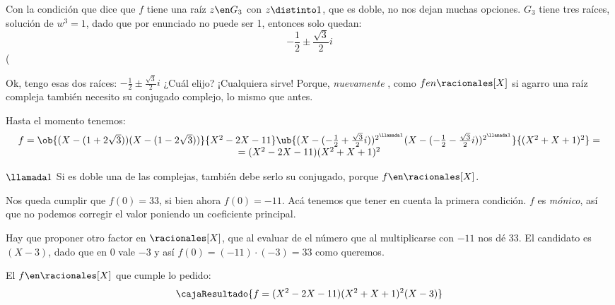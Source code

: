 \bigskip

Con la condición que dice que $f$ tiene una raíz $z \en G_3$ con $z \distinto 1$,
que es doble, no nos dejan muchas opciones. $G_3$ tiene tres raíces, solución
de $w^3 = 1$, dado que por enunciado no puede ser 1, entonces solo quedan:
$$
  -\frac{1}{2} \pm \frac{\sqrt{3}}{2}i
$$
(

\bigskip

Ok, tengo esas dos raíces: $-\frac{1}{2} \pm \frac{\sqrt{3}}{2}i$ ¿Cuál elijo? ¡Cualquiera
sirve! Porque, \textit{nuevamente {\tiny {}}}, como $f en \racionales[X]$ si agarro una raíz compleja
también necesito su conjugado complejo, lo mismo que antes.\par

Hasta el momento tenemos:
$$
  \begin{array}{c}
    f =
    \ob{(X - (1+2\sqrt{3})) (X - (1-2\sqrt{3}))}{X^2 - 2X - 11}
    \ub{(X - (-\frac{1}{2} + \frac{\sqrt{3}}{2}i))^{2^{\llamada1}}
    (X - (-\frac{1}{2} - \frac{\sqrt{3}}{2}i))^{2^{\llamada1}}}{(X^2 + X + 1)^2} = \\
    =(X^2 - 2X - 11)(X^2 + X + 1)^2
  \end{array}
$$

$\llamada1$ Si es doble una de las complejas, también debe serlo su conjugado, porque
$f\en \racionales[X]$.\bigskip

Nos queda cumplir que $f(0) = 33$, si bien ahora $f(0) = -11$. Acá tenemos que tener en cuenta
la primera condición. $f$ es \textit{mónico}, así que no podemos corregir el valor poniendo un coeficiente principal.

Hay que proponer otro factor en $\racionales[X]$, que al evaluar de el número que al multiplicarse con $-11$ nos dé
33. El candidato es $(X-3)$, dado que en 0 vale $-3$ y así $f(0) = (-11) \cdot (-3) = 33$ como queremos.\par

\bigskip

El $f \en\racionales[X]$ que cumple lo pedido:
$$
  \cajaResultado{f = (X^2 - 2X - 11)(X^2 + X + 1)^2(X-3)}
$$

\begin{aportes}
  \item {}
\end{aportes}
